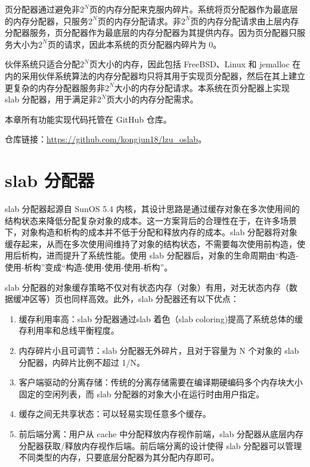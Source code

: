 \documentclass[AutoFakeBold]{LZUThesis}
\begin{document}
\begin{sloppypar}
页分配器通过避免非\(2^N\)页的内存分配来克服内碎片。系统将页分配器作为最底层的内存分配器，只服务\(2^N\)页的内存分配请求。非\(2^N\)页的内存分配请求由上层内存分配器服务，页分配器作为最底层的内存分配器为其提供内存。因为页分配器只服务大小为$2^N$页的请求，因此本系统的页分配器内碎片为 0。

伙伴系统只适合分配\(2^N\)页大小的内存，因此包括 FreeBSD、Linux 和 jemalloc 在内的采用伙伴系统算法的内存分配器均只将其用于实现页分配器，然后在其上建立更复杂的内存分配器服务非\(2^N\)大小的内存分配请求。本系统在页分配器上实现 slab 分配器，用于满足非\(2^N\)页大小的内存分配需求。

本章所有功能实现代码托管在 GitHub 仓库。

仓库链接：\href{https://github.com/kongjun18/lzu_oslab}{https://github.com/kongjun18/lzu\_oslab}。

\chapter{slab 分配器}

slab 分配器起源自 SunOS 5.4 内核，其设计思路是通过缓存对象在多次使用间的结构状态来降低分配复杂对象的成本。这一方案背后的合理性在于，在许多场景下，对象构造和析构的成本并不低于分配和释放内存的成本。slab 分配器将对象缓存起来，从而在多次使用间维持了对象的结构状态，不需要每次使用前构造，使用后析构，进而提升了系统性能。使用 slab 分配器后，对象的生命周期由“构造-使用-析构”变成“构造-使用-使用-使用-析构”。

slab 分配器的对象缓存策略不仅对有状态内存（对象）有用，对无状态内存（数据缓冲区等）页也同样高效。此外，slab 分配器还有以下优点：

\begin{enumerate}
\def\labelenumi{\arabic{enumi}.}
\item
  缓存利用率高：slab 分配器通过slab 着色（slab coloring)提高了系统总体的缓存利用率和总线平衡程度。
\item
  内存碎片小且可调节：slab 分配器无外碎片，且对于容量为 N 个对象的 slab 分配器，内碎片比例不超过 1/N。
\item
  客户端驱动的分离存储：传统的分离存储需要在编译期硬编码多个内存块大小固定的空闲列表，而
  slab 分配器的对象大小在运行时由用户指定。
\item
  缓存之间无共享状态：可以轻易实现任意多个缓存。
\item
  前后端分离：用户从 cache 中分配释放内存视作前端，slab
  分配器从底层内存分配器获取/释放内存视作后端。前后端分离的设计使得 slab 分配器可以管理不同类型的内存，只要底层分配器为其分配内存即可。
\end{enumerate}


\end{sloppypar}
\end{document}
